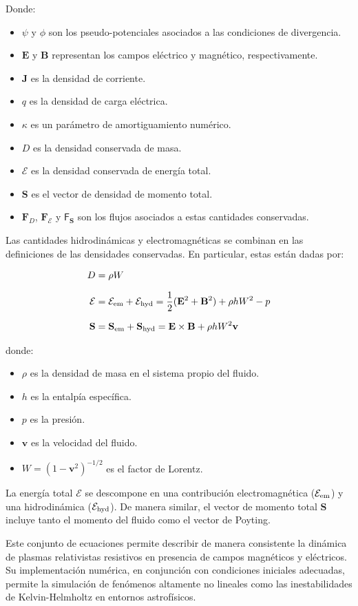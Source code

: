 Donde:
\begin{itemize}
    \item $\psi$ y $\phi$ son los pseudo-potenciales asociados a las condiciones de divergencia.
    \item $\mathbf{E}$ y $\mathbf{B}$ representan los campos eléctrico y magnético, respectivamente.
    \item $\mathbf{J}$ es la densidad de corriente.
    \item $q$ es la densidad de carga eléctrica.
    \item  $\kappa$ es un parámetro de amortiguamiento numérico.
    \item $D$ es la densidad conservada de masa.
    \item $\mathcal{E}$ es la densidad conservada de energía total.
    \item $\mathbf{S}$ es el vector de densidad de momento total.
    \item $\mathbf{F}_D$, $\mathbf{F}_{\mathcal{E}}$ y $\boldsymbol{\mathsf{F}}_{\mathbf{S}}$ son los flujos asociados a estas cantidades conservadas.
\end{itemize}

Las cantidades hidrodinámicas y electromagnéticas se combinan en las definiciones de las densidades conservadas. En particular, estas están dadas por:

\begin{center}
\begin{align*}
D &= \rho W \\[1.5ex]
\mathcal{E} &= \mathcal{E}_{\rm em} + \mathcal{E}_{\rm hyd} = \frac{1}{2}(\mathbf{E}^2 + \mathbf{B}^2) + \rho h W^2 - p \\[1.5ex]
\mathbf{S} &= \mathbf{S}_{\rm em} + \mathbf{S}_{\rm hyd} = \mathbf{E} \times \mathbf{B} + \rho h W^2 \mathbf{v}
\end{align*}
\end{center}

donde:
\begin{itemize}
    \item $\rho$ es la densidad de masa en el sistema propio del fluido.
    \item $h$ es la entalpía específica.
    \item $p$ es la presión.
    \item $\mathbf{v}$ es la velocidad del fluido.
    \item $W = (1 - \mathbf{v}^2)^{-1/2}$ es el factor de Lorentz.
\end{itemize}
La energía total $\mathcal{E}$ se descompone en una contribución electromagnética ($\mathcal{E}_{\rm em}$) y una hidrodinámica ($\mathcal{E}_{\rm hyd}$). De manera similar, el vector de momento total $\mathbf{S}$ incluye tanto el momento del fluido como el vector de Poyting.

Este conjunto de ecuaciones permite describir de manera consistente la dinámica de plasmas relativistas resistivos en presencia de campos magnéticos y eléctricos. Su implementación numérica, en conjunción con condiciones iniciales adecuadas, permite la simulación de fenómenos altamente no lineales como las inestabilidades de Kelvin-Helmholtz en entornos astrofísicos.